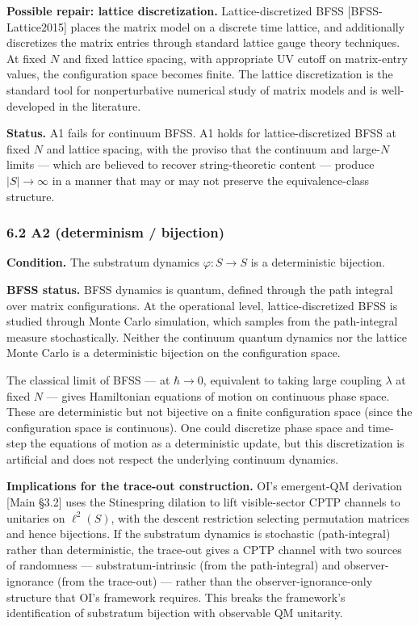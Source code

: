 \documentclass[
]{article}
\begin{document}
\textbf{Possible repair: lattice discretization.} Lattice-discretized
BFSS {[}BFSS-Lattice2015{]} places the matrix model on a discrete time
lattice, and additionally discretizes the matrix entries through
standard lattice gauge theory techniques. At fixed \(N\) and fixed
lattice spacing, with appropriate UV cutoff on matrix-entry values, the
configuration space becomes finite. The lattice discretization is the
standard tool for nonperturbative numerical study of matrix models and
is well-developed in the literature.

\textbf{Status.} A1 fails for continuum BFSS. A1 holds for
lattice-discretized BFSS at fixed \(N\) and lattice spacing, with the
proviso that the continuum and large-\(N\) limits --- which are believed
to recover string-theoretic content --- produce \(|S| \to \infty\) in a
manner that may or may not preserve the equivalence-class structure.

\hypertarget{a2-determinism-bijection}{%
\subsubsection{6.2 A2 (determinism /
bijection)}\label{a2-determinism-bijection}}

\textbf{Condition.} The substratum dynamics \(\varphi: S \to S\) is a
deterministic bijection.

\textbf{BFSS status.} BFSS dynamics is quantum, defined through the path
integral over matrix configurations. At the operational level,
lattice-discretized BFSS is studied through Monte Carlo simulation,
which samples from the path-integral measure stochastically. Neither the
continuum quantum dynamics nor the lattice Monte Carlo is a
deterministic bijection on the configuration space.

The classical limit of BFSS --- at \(\hbar \to 0\), equivalent to taking
large coupling \(\lambda\) at fixed \(N\) --- gives Hamiltonian
equations of motion on continuous phase space. These are deterministic
but not bijective on a finite configuration space (since the
configuration space is continuous). One could discretize phase space and
time-step the equations of motion as a deterministic update, but this
discretization is artificial and does not respect the underlying
continuum dynamics.

\textbf{Implications for the trace-out construction.} OI's emergent-QM
derivation {[}Main §3.2{]} uses the Stinespring dilation to lift
visible-sector CPTP channels to unitaries on \(\ell^2(S)\), with the
descent restriction selecting permutation matrices and hence bijections.
If the substratum dynamics is stochastic (path-integral) rather than
deterministic, the trace-out gives a CPTP channel with two sources of
randomness --- substratum-intrinsic (from the path-integral) and
observer-ignorance (from the trace-out) --- rather than the
observer-ignorance-only structure that OI's framework requires. This
breaks the framework's identification of substratum bijection with
observable QM unitarity.
\end{document}
